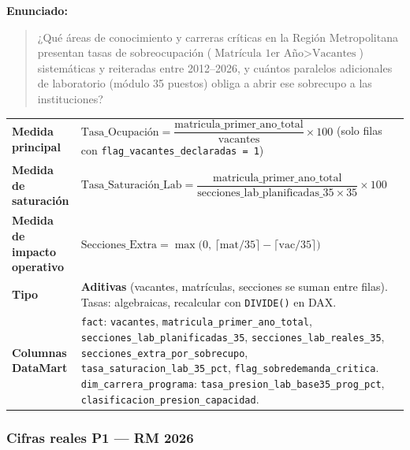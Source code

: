 \documentclass[11pt,a4paper]{article}
\begin{document}
\textbf{Enunciado:}
\begin{quote}
¿Qué áreas de conocimiento y carreras críticas en la Región Metropolitana
presentan tasas de sobreocupación ($\text{Matrícula 1er Año} > \text{Vacantes}$)
sistemáticas y reiteradas entre 2012--2026, y cuántos paralelos adicionales de
laboratorio (módulo 35 puestos) obliga a abrir ese sobrecupo a las instituciones?
\end{quote}

\begin{center}\small
\begin{tabularx}{\textwidth}{@{}>{\bfseries}p{4.5cm}Y@{}}
\toprule
Medida principal &
  $\text{Tasa\_Ocupación} = \dfrac{\text{matricula\_primer\_ano\_total}}{\text{vacantes}} \times 100$
  (solo filas con \texttt{flag\_vacantes\_declaradas = 1}) \\[6pt]
Medida de saturación &
  $\text{Tasa\_Saturación\_Lab} = \dfrac{\text{matricula\_primer\_ano\_total}}
    {\text{secciones\_lab\_planificadas\_35} \times 35} \times 100$ \\[6pt]
Medida de impacto operativo &
  $\text{Secciones\_Extra} = \max\!\bigl(0,\,\lceil\text{mat}/35\rceil - \lceil\text{vac}/35\rceil\bigr)$ \\[4pt]
Tipo &
  \textbf{Aditivas} (vacantes, matrículas, secciones se suman entre filas).
  Tasas: algebraicas, recalcular con \texttt{DIVIDE()} en DAX. \\
Columnas DataMart &
  \texttt{fact}: \texttt{vacantes}, \texttt{matricula\_primer\_ano\_total},
  \texttt{secciones\_lab\_planificadas\_35}, \texttt{secciones\_lab\_reales\_35},
  \texttt{secciones\_extra\_por\_sobrecupo}, \texttt{tasa\_saturacion\_lab\_35\_pct},
  \texttt{flag\_sobredemanda\_critica}.
  \texttt{dim\_carrera\_programa}: \texttt{tasa\_presion\_lab\_base35\_prog\_pct},
  \texttt{clasificacion\_presion\_capacidad}. \\
\bottomrule
\end{tabularx}
\end{center}

\subsubsection{Cifras reales P1 — RM 2026}
\end{document}
